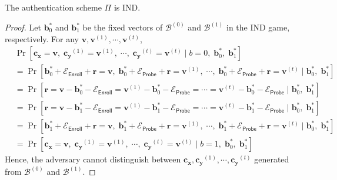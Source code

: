 \begin{theorem}
\label{thm:rh:ind:particular-biometri-layer}
The authentication scheme $\Pi$ is IND.

\end{theorem}

\begin{proof}

Let $\mathbf{b}^*_0$ and $\mathbf{b}^*_1$ be the fixed vectors of $\mathcal{B}^{(0)}$ and $\mathcal{B}^{(1)}$ in the \textsf{IND} game, respectively. For any $\mathbf{v}, \mathbf{v}^{(1)}, \cdots, \mathbf{v}^{(t)}$,
\begin{align*}
	& \Pr[ \mathbf{c_x} = \mathbf{v},\; \mathbf{c_y}^{(1)} = \mathbf{v}^{(1)},\; \cdots,\; \mathbf{c_y}^{(t)} = \mathbf{v}^{(t)} \mid b = 0,\; \mathbf{b}^*_0,\; \mathbf{b}^*_1 ] \\
	&= \Pr[ \mathbf{b}^*_0 + \mathcal{E}_{\textsf{Enroll}} + \mathbf{r} = \mathbf{v},\; \mathbf{b}^*_0 + \mathcal{E}_{\textsf{Probe}} + \mathbf{r} =\mathbf{v}^{(1)},\; \cdots,\; \mathbf{b}^*_0 + \mathcal{E}_{\textsf{Probe}} + \mathbf{r} =\mathbf{v}^{(t)} \mid \mathbf{b}^*_0,\; \mathbf{b}^*_1] \\ 
	&= \Pr[ \mathbf{r} = \mathbf{v} - \mathbf{b}^*_0 - \mathcal{E}_{\textsf{Enroll}} =\mathbf{v}^{(1)} - \mathbf{b}^*_0 - \mathcal{E}_{\textsf{Probe}} = \cdots = \mathbf{v}^{(t)} - \mathbf{b}^*_0 - \mathcal{E}_{\textsf{Probe}} \mid \mathbf{b}^*_0,\; \mathbf{b}^*_1] \\ 
	&= \Pr[ \mathbf{r} = \mathbf{v} - \mathbf{b}^*_1 - \mathcal{E}_{\textsf{Enroll}} = \mathbf{v}^{(1)} - \mathbf{b}^*_1 - \mathcal{E}_{\textsf{Probe}} = \cdots = \mathbf{v}^{(t)} - \mathbf{b}^*_1 - \mathcal{E}_{\textsf{Probe}} \mid \mathbf{b}^*_0,\; \mathbf{b}^*_1] \\ 
	&= \Pr[ \mathbf{b}^*_1 + \mathcal{E}_{\textsf{Enroll}} + \mathbf{r} = \mathbf{v},\; \mathbf{b}^*_1 + \mathcal{E}_{\textsf{Probe}} + \mathbf{r} =\mathbf{v}^{(1)},\; \cdots,\; \mathbf{b}^*_1 + \mathcal{E}_{\textsf{Probe}} + \mathbf{r} =\mathbf{v}^{(t)} \mid \mathbf{b}^*_0,\; \mathbf{b}^*_1] \\ 
	&= \Pr[ \mathbf{c_x} = \mathbf{v},\; \mathbf{c_y}^{(1)} = \mathbf{v}^{(1)},\; \cdots,\; \mathbf{c_y}^{(t)} = \mathbf{v}^{(t)} \mid b = 1,\; \mathbf{b}^*_0,\; \mathbf{b}^*_1  ]
\end{align*}
Hence, the adversary cannot distinguish between $\mathbf{c_x}, \mathbf{c_y}^{(1)}, \cdots, \mathbf{c_y}^{(t)}$ generated from $\mathcal{B}^{(0)}$ and $\mathcal{B}^{(1)}$.

\end{proof}

